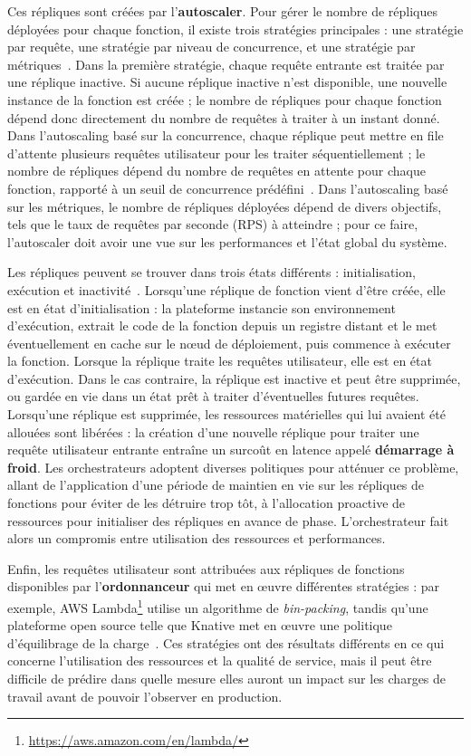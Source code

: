Ces répliques sont créées par l'\textbf{autoscaler}. Pour gérer le nombre de répliques déployées pour chaque fonction, il existe trois stratégies principales : une stratégie par requête, une stratégie par niveau de concurrence, et une stratégie par métriques~\cite{mahmoudiSimFaaSPerformanceSimulator2021}. Dans la première stratégie, chaque requête entrante est traitée par une réplique inactive. Si aucune réplique inactive n'est disponible, une nouvelle instance de la fonction est créée ; le nombre de répliques pour chaque fonction dépend donc directement du nombre de requêtes à traiter à un instant donné. Dans l'autoscaling basé sur la concurrence, chaque réplique peut mettre en file d'attente plusieurs requêtes utilisateur pour les traiter séquentiellement ; le nombre de répliques dépend du nombre de requêtes en attente pour chaque fonction, rapporté à un seuil de concurrence prédéfini~\cite{herofake}. Dans l'autoscaling basé sur les métriques, le nombre de répliques déployées dépend de divers objectifs, tels que le taux de requêtes par seconde (RPS) à atteindre ; pour ce faire, l'autoscaler doit avoir une vue sur les performances et l'état global du système.

Les répliques peuvent se trouver dans trois états différents : initialisation, exécution et inactivité~\cite{SchleierSmith2021WhatSC}. Lorsqu'une réplique de fonction vient d'être créée, elle est en état d'initialisation : la plateforme instancie son environnement d'exécution, extrait le code de la fonction depuis un registre distant et le met éventuellement en cache sur le nœud de déploiement, puis commence à exécuter la fonction. Lorsque la réplique traite les requêtes utilisateur, elle est en état d'exécution. Dans le cas contraire, la réplique est inactive et peut être supprimée, ou gardée en vie dans un état prêt à traiter d'éventuelles futures requêtes. Lorsqu'une réplique est supprimée, les ressources matérielles qui lui avaient été allouées sont libérées : la création d'une nouvelle réplique pour traiter une requête utilisateur entrante entraîne un surcoût en latence appelé \textbf{démarrage à froid}. Les orchestrateurs adoptent diverses politiques pour atténuer ce problème, allant de l'application d'une période de maintien en vie sur les répliques de fonctions pour éviter de les détruire trop tôt, à l'allocation proactive de ressources pour initialiser des répliques en avance de phase. L'orchestrateur fait alors un compromis entre utilisation des ressources et performances.

Enfin, les requêtes utilisateur sont attribuées aux répliques de fonctions disponibles par l'\textbf{ordonnanceur} qui met en œuvre différentes stratégies : par exemple, AWS Lambda\footnote{\href{https://aws.amazon.com/en/lambda/}{https://aws.amazon.com/en/lambda/}} utilise un algorithme de \textit{bin-packing}, tandis qu'une plateforme open source telle que Knative met en œuvre une politique d'équilibrage de la charge~\cite{Lannurien2023}. Ces stratégies ont des résultats différents en ce qui concerne l'utilisation des ressources et la qualité de service, mais il peut être difficile de prédire dans quelle mesure elles auront un impact sur les charges de travail avant de pouvoir l'observer en production.

